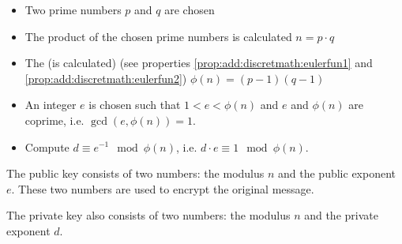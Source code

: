 \begin{itemize}
\item Two prime numbers $p$ and $q$ are chosen
\item The product of the chosen prime numbers is calculated $n = p\cdot q$
\item The 
(is calculated) (see properties \ref{prop:add:discretmath:eulerfun1} and \ref{prop:add:discretmath:eulerfun2})
\(
\phi\left(n\right)=\left(p - 1 \right)\left(q - 1 \right)
\)
\item An integer $e$ is chosen such that 
\(
1 < e < \phi\left(n\right)
\) and $e$ and $\phi\left(n\right)$ are coprime,
i.e.
\(
\gcd\left( e, \phi\left(n\right) \right) = 1.
\)
\item Compute $d \equiv e^{-1} \mod{\phi\left(n\right)}$, i.e.
$d \cdot e \equiv 1 \mod{\phi\left(n\right)}$.
\end{itemize}

The public key consists of two numbers: the modulus $n$ and the public exponent
$e$. These two numbers are used to encrypt the original
message.

The private key also consists of two numbers: the modulus $n$ and the private exponent
$d$.
